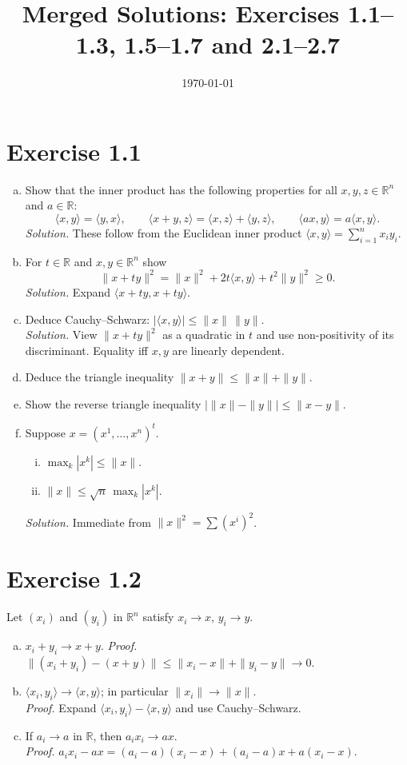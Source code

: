 \documentclass[11pt,a4paper]{article}
\title{Merged Solutions: Exercises 1.1--1.3, 1.5--1.7 and 2.1--2.7}
\author{}
\date{\today}
\begin{document}
\maketitle

\section*{Exercise 1.1}
\begin{enumerate}[a)]
\item Show that the inner product has the following properties for all $x,y,z\in\mathbb{R}^n$ and $a\in\mathbb{R}$:
\[
\langle x,y\rangle=\langle y,x\rangle,\qquad
\langle x+y,z\rangle=\langle x,z\rangle+\langle y,z\rangle,\qquad
\langle ax,y\rangle=a\langle x,y\rangle.
\]
\textit{Solution.} These follow from the Euclidean inner product $\langle x,y\rangle=\sum_{i=1}^n x_i y_i$.

\item For $t\in\mathbb{R}$ and $x,y\in\mathbb{R}^n$ show
\[
\|x+ty\|^2=\|x\|^2+2t\langle x,y\rangle+t^2\|y\|^2\ge 0.
\]
\textit{Solution.} Expand $\langle x+ty,x+ty\rangle$.

\item Deduce Cauchy--Schwarz: $|\langle x,y\rangle|\le \|x\|\,\|y\|$.\\
\textit{Solution.} View $\|x+ty\|^2$ as a quadratic in $t$ and use non-positivity of its discriminant.
Equality iff $x,y$ are linearly dependent.

\item Deduce the triangle inequality $\|x+y\|\le \|x\|+\|y\|$.

\item Show the reverse triangle inequality $|\|x\|-\|y\||\le \|x-y\|$.

\item Suppose $x=(x^1,\dots,x^n)^t$.
\begin{enumerate}[i)]
\item $\displaystyle \max_{k}|x^k|\le \|x\|$.
\item $\displaystyle \|x\|\le \sqrt{n}\,\max_{k}|x^k|$.
\end{enumerate}
\textit{Solution.} Immediate from $\|x\|^2=\sum (x^i)^2$.
\end{enumerate}

\section*{Exercise 1.2}
Let $(x_i)$ and $(y_i)$ in $\mathbb{R}^n$ satisfy $x_i\to x$, $y_i\to y$.
\begin{enumerate}[a)]
\item $x_i+y_i\to x+y$. \textit{Proof.} $\|(x_i+y_i)-(x+y)\|\le \|x_i-x\|+\|y_i-y\|\to 0$.
\item $\langle x_i,y_i\rangle\to \langle x,y\rangle$; in particular $\|x_i\|\to \|x\|$.\\
\textit{Proof.} Expand $\langle x_i,y_i\rangle-\langle x,y\rangle$ and use Cauchy--Schwarz.
\item If $a_i\to a$ in $\mathbb{R}$, then $a_i x_i\to ax$.\\
\textit{Proof.} $a_ix_i-ax=(a_i-a)(x_i-x)+(a_i-a)x+a(x_i-x)$.
\end{enumerate}
\end{document}
